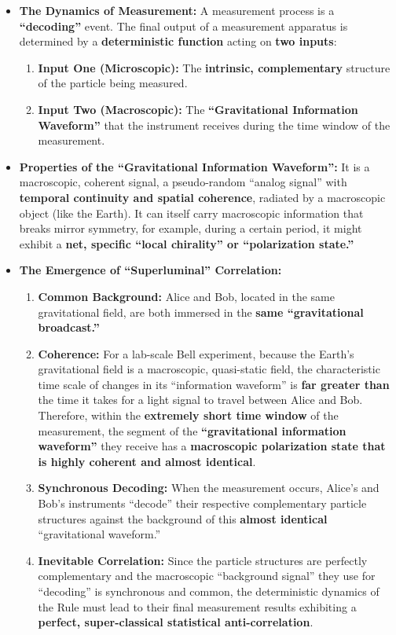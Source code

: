 \documentclass[11pt, a4paper]{article}
\begin{document}
\begin{itemize}
    \item \textbf{The Dynamics of Measurement:}
    A measurement process is a \textbf{``decoding''} event. The final output of a measurement apparatus is determined by a \textbf{deterministic function} acting on \textbf{two inputs}:
    \begin{enumerate}
        \item \textbf{Input One (Microscopic):} The \textbf{intrinsic, complementary} structure of the particle being measured.
        \item \textbf{Input Two (Macroscopic):} The \textbf{``Gravitational Information Waveform''} that the instrument receives during the time window of the measurement.
    \end{enumerate}

    \item \textbf{Properties of the ``Gravitational Information Waveform'':}
    It is a macroscopic, coherent signal, a pseudo-random ``analog signal'' with \textbf{temporal continuity and spatial coherence}, radiated by a macroscopic object (like the Earth). It can itself carry macroscopic information that breaks mirror symmetry, for example, during a certain period, it might exhibit a \textbf{net, specific ``local chirality'' or ``polarization state.''}

    \item \textbf{The Emergence of ``Superluminal'' Correlation:}
    \begin{enumerate}
        \item \textbf{Common Background:} Alice and Bob, located in the same gravitational field, are both immersed in the \textbf{same ``gravitational broadcast.''}
        \item \textbf{Coherence:} For a lab-scale Bell experiment, because the Earth's gravitational field is a macroscopic, quasi-static field, the characteristic time scale of changes in its ``information waveform'' is \textbf{far greater than} the time it takes for a light signal to travel between Alice and Bob. Therefore, within the \textbf{extremely short time window} of the measurement, the segment of the \textbf{``gravitational information waveform''} they receive has a \textbf{macroscopic polarization state that is highly coherent and almost identical}.
        \item \textbf{Synchronous Decoding:} When the measurement occurs, Alice's and Bob's instruments ``decode'' their respective complementary particle structures against the background of this \textbf{almost identical} ``gravitational waveform.''
        \item \textbf{Inevitable Correlation:} Since the particle structures are perfectly complementary and the macroscopic ``background signal'' they use for ``decoding'' is synchronous and common, the deterministic dynamics of the Rule must lead to their final measurement results exhibiting a \textbf{perfect, super-classical statistical anti-correlation}.
    \end{enumerate}
\end{itemize}
\end{document}
